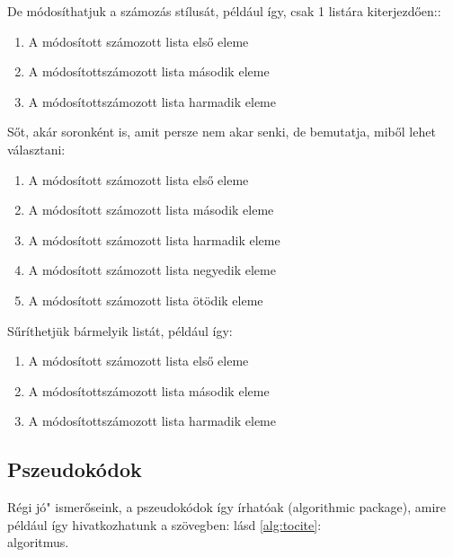 \documentclass[12pt,a4paper]{article}
\begin{document}
		De módosíthatjuk a számozás stílusát, például így, csak 1 listára kiterjezdően::
		
		\begin{enumerate}
		    \renewcommand{\labelenumi}{\alph{enumi}.)}
		    \item A módosított számozott lista első eleme
		    \item A módosítottszámozott lista második eleme
			\item A módosítottszámozott lista harmadik eleme
		\end{enumerate}
		
		Sőt, akár soronként is, amit persze nem akar senki, de bemutatja, miből lehet választani:
		\begin{enumerate}
		    \renewcommand{\labelenumi}{\arabic{enumi}.} %
		    \item A módosított számozott lista első eleme
		    \renewcommand{\labelenumi}{\alph{enumi}.)}
		    \item A módosított számozott lista második eleme
		    \renewcommand{\labelenumi}{\Alph{enumi}.)}
			\item A módosított számozott lista harmadik eleme
			\renewcommand{\labelenumi}{\roman{enumi}.}
			\item A módosított számozott lista negyedik eleme
			\renewcommand{\labelenumi}{\Roman{enumi}.}
			\item A módosított számozott lista ötödik eleme
		\end{enumerate}
		
		
		Sűríthetjük bármelyik listát, például így:
		
		\begin{enumerate}[noitemsep]
		    \renewcommand{\labelenumi}{\alph{enumi}.)}
		    \item A módosított számozott lista első eleme
		    \item A módosítottszámozott lista második eleme
			\item A módosítottszámozott lista harmadik eleme
		\end{enumerate}
	
	\subsection{Pszeudokódok}
	    Régi \leftq jó" ismerőseink, a pszeudokódok így írhatóak (algorithmic package), amire például így hivatkozhatunk a szövegben: lásd \ref{alg:tocite}:\\ algoritmus.
	    
\end{document}
